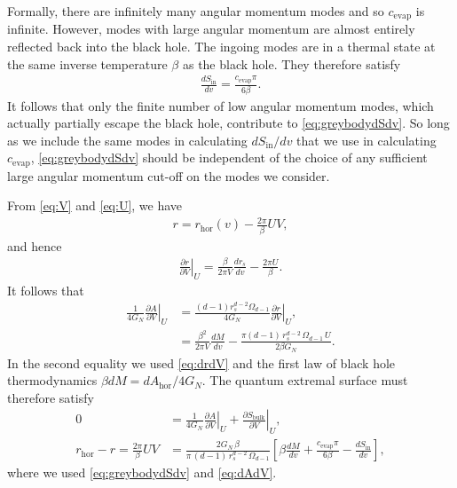 \documentclass[12pt]{article}
\begin{document}
Formally, there are infinitely many angular momentum modes and so $c_\text{evap}$ is infinite. However, modes with large angular momentum are almost entirely reflected back into the black hole. The ingoing modes are in a thermal state at the same inverse temperature $\beta$ as the black hole. They therefore satisfy \cite{calabrese2004entanglement, calabrese2009entanglement}
\begin{align}
\frac{d S_\text{in}}{d v} = \frac{c_\text{evap} \pi}{6 \beta}.
\end{align}
It follows that only the finite number of low angular momentum modes, which actually partially escape the black hole, contribute to \eqref{eq:greybodydSdv}. So long as we include the same modes in calculating $dS_{\text{in}}/dv$ that we use in calculating $c_\text{evap}$, \eqref{eq:greybodydSdv} should be independent of the choice of any sufficient large angular momentum cut-off on the modes we consider.

From \eqref{eq:V} and \eqref{eq:U}, we have
\begin{align} \label{eq:rUV}
r = r_\text{hor}(v) - \frac{2 \pi}{\beta} UV,
\end{align}
and hence
\begin{align} \label{eq:drdV}
\left. \frac{\partial r}{\partial V} \right|_U = \frac{\beta}{2 \pi V} \frac{d r_s}{d v} - \frac{2 \pi U}{\beta}.
\end{align}
It follows that
\begin{align}
\frac{1}{4 G_N} \left. \frac{\partial A}{\partial V} \right|_U &= \frac{(d-1) r_s^{d-2} \Omega_{d-1}}{4 G_N} \left. \frac{\partial r}{\partial V} \right|_U,
\\ & = \frac{\beta^2}{2 \pi V} \frac{d M}{d v} - \frac{\pi (d-1)\, r_s^{d-2} \,\Omega_{d-1}\, U}{2 \beta G_N}. \label{eq:dAdV}
\end{align}
In the second equality we used \eqref{eq:drdV} and the first law of black hole thermodynamics $\beta dM = dA_\text{hor}/4G_N$. The quantum extremal surface must therefore satisfy
\begin{align}
0 &= \frac{1}{4 G_N} \left. \frac{\partial A}{\partial V} \right|_U + \left.\frac{\partial S_\text{bulk}}{\partial V}\right|_U,
\\  r_{\text{hor}} - r = \frac{2 \pi}{\beta} U V &=  \frac{2 G_N\,\beta}{\pi\,(d-1)\, r_s^{d-2} \,\Omega_{d-1}}\left[\beta \frac{d M}{d v} + \frac{c_\text{evap} \pi}{6 \beta} - \frac{d S_\text{in}}{d v}\right], \label{eq:marginalgreybody}
\end{align}
where we used \eqref{eq:greybodydSdv} and \eqref{eq:dAdV}.
\end{document}
